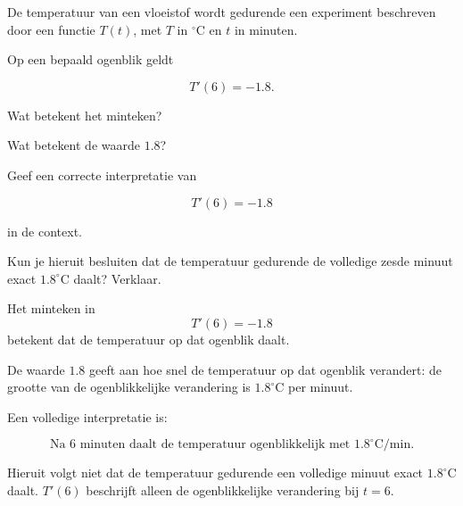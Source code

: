 \documentclass{ximera}
\begin{document}
\begin{oefening}{\oefU}

De temperatuur van een vloeistof wordt gedurende een experiment
beschreven door een functie $T(t)$, met $T$ in $^\circ\mathrm{C}$
en $t$ in minuten.

Op een bepaald ogenblik geldt

\[
T'(6)=-1.8.
\]

\begin{question}
Wat betekent het minteken?
\end{question}

\begin{question}
Wat betekent de waarde $1.8$?
\end{question}

\begin{question}
Geef een correcte interpretatie van

\[
T'(6)=-1.8
\]

in de context.
\end{question}

\begin{question}
Kun je hieruit besluiten dat de temperatuur gedurende de volledige
zesde minuut exact $1.8^\circ\mathrm{C}$ daalt? Verklaar.
\end{question}

\begin{oplossing}

Het minteken in
\[
T'(6)=-1.8
\]
betekent dat de temperatuur op dat ogenblik daalt.

De waarde $1.8$ geeft aan hoe snel de temperatuur op dat ogenblik
verandert: de grootte van de ogenblikkelijke verandering is
$1.8^\circ\mathrm{C}$ per minuut.

Een volledige interpretatie is:

\[
\boxed{\text{Na 6 minuten daalt de temperatuur ogenblikkelijk met }
1.8^\circ\mathrm{C/min}.}
\]

Hieruit volgt niet dat de temperatuur gedurende een volledige minuut
exact $1.8^\circ\mathrm{C}$ daalt. $T'(6)$ beschrijft alleen de
ogenblikkelijke verandering bij $t=6$.

\end{oplossing}

\end{oefening}


\end{document}
